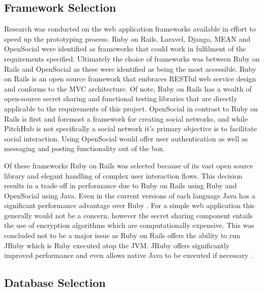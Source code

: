 \subsection{Framework Selection}\label{SS:frameworkSelection}

Research was conducted on the web application frameworks available in effort to speed up the prototyping process. Ruby on Rails, Laravel, Django, MEAN and OpenSocial were identified as frameworks that could work in fulfilment of the requirements specified. Ultimately the choice of frameworks was between Ruby on Rails and OpenSocial as these were identified as being the most accessible. Ruby on Rails is an open source framework that embraces RESTful web service design and conforms to the MVC architecture. Of note, Ruby on Rails has a wealth of open-source secret sharing and functional testing libraries that are directly applicable to the requirements of this project. OpenSocial in contrast to Ruby on Rails is first and foremost a framework for creating social networks, and while PitchHub is not specifically a social network it's primary objective is to facilitate social interaction. Using OpenSocial would offer user authentication as well as messaging and posting functionality out of the box. 
\par
Of these frameworks Ruby on Rails was selected because of its vast open source library and elegant handling of complex user interaction flows. This decision results in a trade off in performance due to Ruby on Rails using Ruby and OpenSocial using Java. Even in the current versions of each language Java has a significant  performance advantage over Ruby \cite{Perfo1:online}. For a simple web application this generally would not be a concern, however the secret sharing component entails the use of encryption algorithms which are computationally expensive. This was concluded not to be a major issue as Ruby on Rails offers the ability to run JRuby which is Ruby executed atop the JVM. JRuby offers significantly improved performance and even allows native Java to be executed if necessary \cite{Jruby:online}.

\subsection{Database Selection}\label{SS:databaseSelection}

